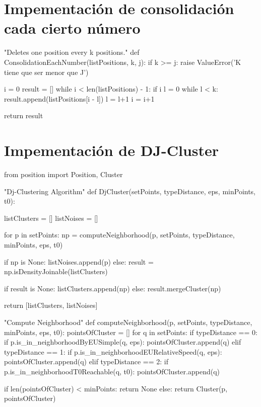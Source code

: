 \documentclass[a4paper, 12pt]{article}
\begin{document}
\newpage
\section{Impementaci\'on de consolidaci\'on cada cierto n\'umero} \label{App:AppendixB}

\begin{python}
"Deletes one position every k positions."
def ConsolidationEachNumber(listPositions, k, j):
	if k >= j:
		raise ValueError('K tiene que ser menor que J')
        
	i = 0
	result = []
	while i < len(listPositions) - 1:
		if i%
			l = 0
			while l < k:
				result.append(listPositions[i - l])
				l = l+1
			i = i+1

	return result
\end{python}


\newpage
\section{Impementaci\'on de DJ-Cluster} \label{App:AppendixC}

\begin{python}
from position import Position, Cluster

"Dj-Clustering Algorithm"
def DjCluster(setPoints, typeDistance, eps, minPoints, t0):

	listClusters = []
	listNoises = []

	for p in setPoints:
		np = computeNeighborhood(p, setPoints, typeDistance, minPoints, eps, t0)

		if np is None:
			listNoises.append(p) 
		else:
			result = np.isDensityJoinable(listClusters)

			if result is None:
				listClusters.append(np) 
			else:
				result.mergeCluster(np)

	return [listClusters, listNoises]

"Compute Neighborhood"
def computeNeighborhood(p, setPoints, typeDistance, minPoints, eps, t0):
	pointsOfCluster = []
	for q in setPoints:
		if typeDistance == 0:
			if p.is_in_neighborhoodByEUSimple(q, eps):
				pointsOfCluster.append(q)
		elif typeDistance == 1:
			if p.is_in_neighborhoodEURelativeSpeed(q, eps):
				pointsOfCluster.append(q)
		elif typeDistance == 2:
			if p.is_in_neighborhoodT0Reachable(q, t0):
				pointsOfCluster.append(q)

	if len(pointsOfCluster) < minPoints:
		return None
	else:
		return Cluster(p, pointsOfCluster)			

\end{python}
\end{document}
